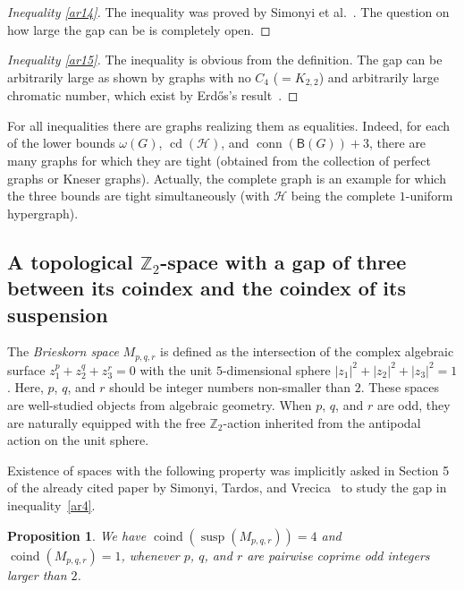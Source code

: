 \documentclass[12pt]{amsart}
\newtheorem{proposition}[theorem]{Proposition}
\theoremstyle{definition}
\def\Z{\mathbb{Z}}
\def\HH{\mathcal{H}}
\def\B{\mathsf{B}}
\def\susp{\operatorname{susp}}
\def\conn{\operatorname{conn}}
\def\coind{\operatorname{coind}}
\def\cd{\operatorname{cd}}
\begin{document}
\begin{proof}[Inequality \eqref{ar14}]
The inequality was proved by Simonyi et al.~\cite{simonyi2013colourful}. The question on how large the gap can be is completely open.
\end{proof}

\begin{proof}[Inequality \eqref{ar15}]
The inequality is obvious from the definition. The gap can be arbitrarily large as shown by graphs with no $C_4$ ($=K_{2,2}$) and arbitrarily large chromatic number, which exist by Erd\H{o}s's result~\cite{erdos1959graph}.
\end{proof}


For all inequalities there are graphs realizing them as equalities. Indeed, for each of the lower bounds $\omega(G)$, $\cd(\HH)$, and $\conn(\B(G))+3$, there are many graphs for which they are tight (obtained from the collection of perfect graphs or Kneser graphs). Actually, the complete graph is an example for which the three bounds are tight simultaneously (with $\HH$ being the complete $1$-uniform hypergraph).

\subsection{A topological \texorpdfstring{$\Z_2$}{Z2}-space with a gap of three between its coindex and the coindex of its suspension}\label{subsec:Briesk}

The \emph{Brieskorn space} $M_{p,q,r}$ is defined as the intersection of the complex algebraic surface $z_1^p + z_2^q + z_3^r = 0$ with the unit $5$-dimensional sphere $|z_1|^2 + |z_2|^2 + |z_3|^2 = 1$. Here, $p$, $q$, and $r$ should be integer numbers non-smaller than $2$. These spaces are well-studied objects from algebraic geometry. When $p$, $q$, and $r$ are odd, they are naturally equipped with the free $\Z_2$-action inherited from the antipodal action on the unit sphere.


Existence of spaces with the following property was implicitly asked in Section 5 of the already cited paper by Simonyi, Tardos, and Vrecica~\cite{simonyi2009local} to study the gap in inequality~\eqref{ar4}.



\begin{proposition}\label{prop:Briesk}
We have $\coind(\susp(M_{p,q,r})) = 4$ and $\coind(M_{p,q,r})=1$, whenever $p$, $q$, and $r$ are pairwise coprime odd integers larger than $2$. 
\end{proposition}
\end{document}
